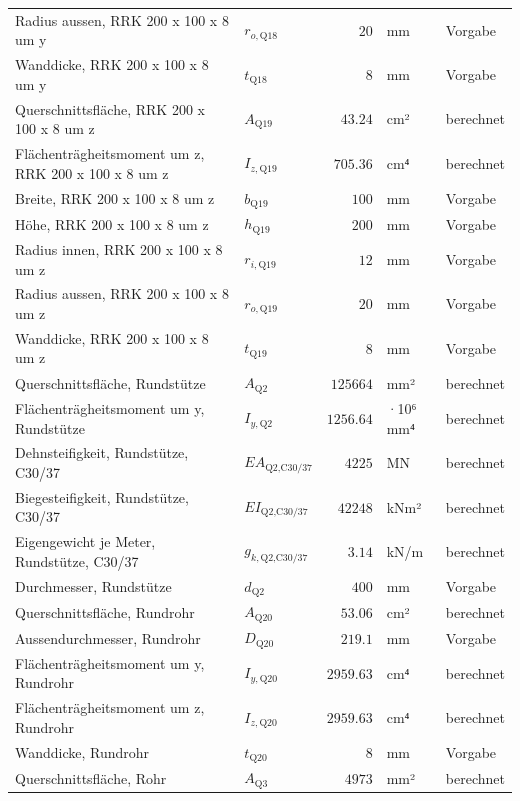 \documentclass[11pt,a4paper]{article}
\begin{document}
\begin{xltabular}{\linewidth}{>{\raggedright\arraybackslash}Xlrll}
Radius aussen, RRK 200 x 100 x 8 um y & $r_{o,\text{Q18}}$ & $20$ & mm & Vorgabe \\
Wanddicke, RRK 200 x 100 x 8 um y & $t_{\text{Q18}}$ & $8$ & mm & Vorgabe \\
Querschnittsfläche, RRK 200 x 100 x 8 um z & $A_{\text{Q19}}$ & $43.24$ & cm² & berechnet \\
Flächenträgheitsmoment um z, RRK 200 x 100 x 8 um z & $I_{z,\text{Q19}}$ & $705.36$ & cm⁴ & berechnet \\
Breite, RRK 200 x 100 x 8 um z & $b_{\text{Q19}}$ & $100$ & mm & Vorgabe \\
Höhe, RRK 200 x 100 x 8 um z & $h_{\text{Q19}}$ & $200$ & mm & Vorgabe \\
Radius innen, RRK 200 x 100 x 8 um z & $r_{i,\text{Q19}}$ & $12$ & mm & Vorgabe \\
Radius aussen, RRK 200 x 100 x 8 um z & $r_{o,\text{Q19}}$ & $20$ & mm & Vorgabe \\
Wanddicke, RRK 200 x 100 x 8 um z & $t_{\text{Q19}}$ & $8$ & mm & Vorgabe \\
Querschnittsfläche, Rundstütze & $A_{\text{Q2}}$ & $125664$ & mm² & berechnet \\
Flächenträgheitsmoment um y, Rundstütze & $I_{y,\text{Q2}}$ & $1256.64$ & ·10⁶ mm⁴ & berechnet \\
Dehnsteifigkeit, Rundstütze, C30/37 & $EA_{\text{Q2,C30/37}}$ & $4225$ & MN & berechnet \\
Biegesteifigkeit, Rundstütze, C30/37 & $EI_{\text{Q2,C30/37}}$ & $42248$ & kNm² & berechnet \\
Eigengewicht je Meter, Rundstütze, C30/37 & $g_{k,\text{Q2,C30/37}}$ & $3.14$ & kN/m & berechnet \\
Durchmesser, Rundstütze & $d_{\text{Q2}}$ & $400$ & mm & Vorgabe \\
Querschnittsfläche, Rundrohr & $A_{\text{Q20}}$ & $53.06$ & cm² & berechnet \\
Aussendurchmesser, Rundrohr & $D_{\text{Q20}}$ & $219.1$ & mm & Vorgabe \\
Flächenträgheitsmoment um y, Rundrohr & $I_{y,\text{Q20}}$ & $2959.63$ & cm⁴ & berechnet \\
Flächenträgheitsmoment um z, Rundrohr & $I_{z,\text{Q20}}$ & $2959.63$ & cm⁴ & berechnet \\
Wanddicke, Rundrohr & $t_{\text{Q20}}$ & $8$ & mm & Vorgabe \\
Querschnittsfläche, Rohr & $A_{\text{Q3}}$ & $4973$ & mm² & berechnet \\

\end{xltabular}
\end{document}
